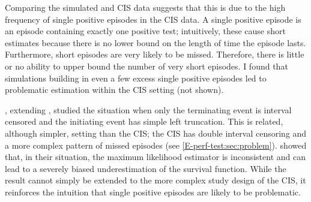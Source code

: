 \documentclass[thesis.tex]{subfiles}
\begin{document}
Comparing the simulated and CIS data suggests that this is due to the high frequency of single positive episodes in the CIS data.
A single positive episode is an episode containing exactly one positive test; intuitively, these cause short estimates because there is no lower bound on the length of time the episode lasts.
Furthermore, short episodes are very likely to be missed.
Therefore, there is little or no ability to upper bound the number of very short episodes.
I found that simulations building in even a few excess single positive episodes led to problematic estimation within the CIS setting (not shown).

\Textcite{shenNonparametrica}, extending \textcite{panNote}, studied the situation when only the terminating event is interval censored and the initiating event has simple left truncation.
This is related, although simpler, setting than the CIS; the CIS has double interval censoring and a more complex pattern of missed episodes (see \cref{E-perf-test:sec:problem}).
\Textcite{shenNonparametrica} showed that, in their situation, the maximum likelihood estimator is inconsistent and can lead to a severely biased underestimation of the survival function.
While the result cannot simply be extended to the more complex study design of the CIS, it reinforces the intuition that single positive episodes are likely to be problematic.
\end{document}
